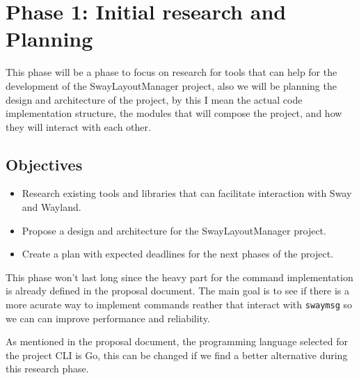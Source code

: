 \section{Phase 1: Initial research and Planning}

This phase will be a phase to focus on research for tools that can help for the development of the SwayLayoutManager project, also we will be planning the design and architecture of the project, by this I mean the actual code implementation structure, the modules that will compose the project, and how they will interact with each other.

\subsection{Objectives}

\begin{itemize}
    \item Research existing tools and libraries that can facilitate interaction with Sway and Wayland.
    \item Propose a design and architecture for the SwayLayoutManager project.
    \item Create a plan with expected deadlines for the next phases of the project.
\end{itemize}

This phase won't last long since the heavy part for the command implementation is already defined in the proposal document. The main goal is to see if there is a more acurate way to implement commands reather that interact with \texttt{swaymsg} so we can can improve performance and reliability.

As mentioned in the proposal document, the programming language selected for the project CLI is Go, this can be changed if we find a better alternative during this research phase.